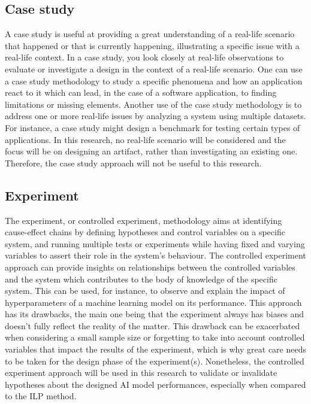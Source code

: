 \subsection{Case study}

A case study is useful at providing a great understanding of a real-life scenario that happened 
or that is currently happening, illustrating a specific issue with a real-life context.
In a case study, you look closely at real-life observations to evaluate or investigate
a design in the context of a real-life scenario\cite{sarah2011caseStudy}.
One can use a case study methodology to study a specific phenomena and how an application react to it
which can lead, in the case of a software application, to finding
limitations or missing elements.
Another use of the case study methodology is 
to address one or more real-life issues by analyzing 
a system using multiple datasets.
For instance, a case study might design a benchmark for testing 
certain types of applications.
In this research, no real-life scenario will be considered and the focus will be on designing an artifact,
rather than investigating an existing one. 
Therefore, the case study approach will not be useful to this research.

\subsection{Experiment}
 
 
The experiment, or controlled experiment, methodology aims at identifying cause-effect 
chains by defining hypotheses and control variables on a specific system,
and running multiple tests or experiments while having fixed and varying variables to assert 
their role in the system's behaviour\cite{basili2007controlledExperiment}.
The controlled experiment approach 
can provide insights on relationships between the controlled variables and the system
which contributes to the body of knowledge of the specific system.
This can be used, for instance, to observe and explain the impact of hyperparameters of a machine learning
model on its performance.
This approach has its drawbacks, the main one being 
that the experiment always has biases and doesn't fully reflect the reality
of the matter. This drawback can be exacerbated when considering 
a small sample size or forgetting
to take into account controlled variables that impact the results
of the experiment, which is why great care needs to be taken 
for the design phase of the experiment(s).
Nonetheless, the controlled experiment approach will be used in this research to validate or invalidate hypotheses
about the designed AI model performances, especially when compared to the ILP method.\\


